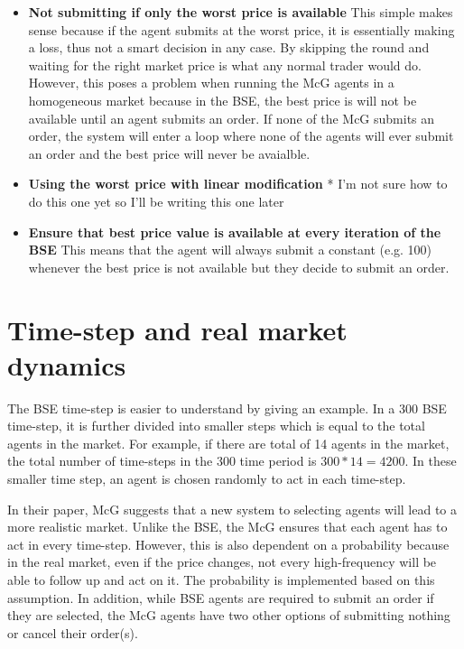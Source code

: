 \begin{itemize}
    \item \textbf{Not submitting if only the worst price is available} This simple makes sense because if the agent submits at the worst price, it is essentially making a loss, thus not a smart decision in any case. By skipping the round and waiting for the right market price is what any normal trader would do. However, this poses a problem when running the McG agents in a homogeneous market because in the BSE, the best price is will not be available until an agent submits an order. If none of the McG submits an order, the system will enter a loop where none of the agents will ever submit an order and the best price will never be avaialble. 
    
    \item \textbf{Using the worst price with linear modification} * I'm not sure how to do this one yet so I'll be writing this one later
    
    \item \textbf{Ensure that best price value is available at every iteration of the BSE} This means that the agent will always submit a constant (e.g. 100) whenever the best price is not available but they decide to submit an order. 
\end{itemize} 

\section{Time-step and real market dynamics}
The BSE time-step is easier to understand by giving an example. In a 300 BSE time-step, it is further divided into smaller steps which is equal to the total agents in the market. For example, if there are total of 14 agents in the market, the total number of time-steps in the 300 time period is $300 * 14 = 4200$. In these smaller time step, an agent is chosen randomly to act in each time-step. 

In their paper, McG suggests that a new system to selecting agents will lead to a more realistic market. Unlike the BSE, the McG ensures that each agent has to act in every time-step. However, this is also dependent on a probability because in the real market, even if the price changes, not every high-frequency will be able to follow up and act on it. The probability is implemented based on this assumption. In addition, while BSE agents are required to submit an order if they are selected, the McG agents have two other options of submitting nothing or cancel their order(s). 

